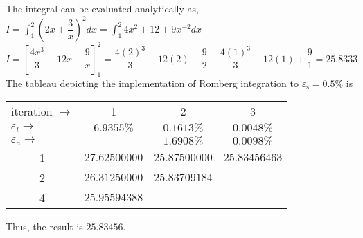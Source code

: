 \documentclass[../main.tex]{subfiles}
\begin{document}
\chapter{}
\label{cha:cha_17}

\section{}
The integral can be evaluated analytically as,
	\bigbreak
$\displaystyle I=\int_{1}^{2}\left(2 x+\dfrac{3}{x}\right)^{2} d x=\int_{1}^{2} 4 x^{2}+12+9 x^{-2} d x $
	\bigbreak
$\displaystyle I=\left[\dfrac{4 x^{3}}{3}+12 x-\dfrac{9}{x}\right]_{1}^{2}=\dfrac{4(2)^{3}}{3}+12(2)-\dfrac{9}{2}-\dfrac{4(1)^{3}}{3}-12(1)+\dfrac{9}{1}=25.8333$
	\bigbreak
The tableau depicting the implementation of Romberg integration to $\varepsilon_{\mathrm{s}}=0.5 \%$ is
	\bigbreak
\begin{tabular}{lccc}
iteration $\rightarrow$ & 1 & 2 & 3 \\
$\varepsilon_{t} \rightarrow$ & $6.9355 \%$ & $0.1613 \%$ & $0.0048 \%$ \\
$\varepsilon_{a} \rightarrow$ &  & $1.6908 \%$ & $0.0098 \%$ \\
\multicolumn{1}{c}{1} & $27.62500000$ & $25.87500000$ & $25.83456463$ \\
\multicolumn{1}{c}{2} & $26.31250000$ & $25.83709184$ &  \\
\multicolumn{1}{c}{4} & $25.95594388$ &  &  \\
\end{tabular}
	\bigbreak
Thus, the result is $25.83456$.
	\bigbreak
\end{document}

